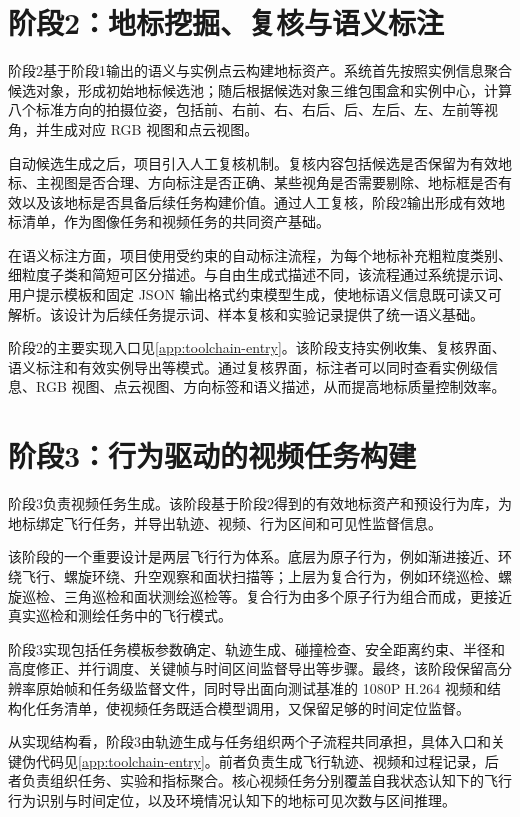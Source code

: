 \section{阶段2：地标挖掘、复核与语义标注}

阶段2基于阶段1输出的语义与实例点云构建地标资产。系统首先按照实例信息聚合候选对象，形成初始地标候选池；随后根据候选对象三维包围盒和实例中心，计算八个标准方向的拍摄位姿，包括前、右前、右、右后、后、左后、左、左前等视角，并生成对应 RGB 视图和点云视图。

自动候选生成之后，项目引入人工复核机制。复核内容包括候选是否保留为有效地标、主视图是否合理、方向标注是否正确、某些视角是否需要剔除、地标框是否有效以及该地标是否具备后续任务构建价值。通过人工复核，阶段2输出形成有效地标清单，作为图像任务和视频任务的共同资产基础。

在语义标注方面，项目使用受约束的自动标注流程，为每个地标补充粗粒度类别、细粒度子类和简短可区分描述。与自由生成式描述不同，该流程通过系统提示词、用户提示模板和固定 JSON 输出格式约束模型生成，使地标语义信息既可读又可解析。该设计为后续任务提示词、样本复核和实验记录提供了统一语义基础。

阶段2的主要实现入口见\autoref{app:toolchain-entry}。该阶段支持实例收集、复核界面、语义标注和有效实例导出等模式。通过复核界面，标注者可以同时查看实例级信息、RGB 视图、点云视图、方向标签和语义描述，从而提高地标质量控制效率。

\section{阶段3：行为驱动的视频任务构建}

阶段3负责视频任务生成。该阶段基于阶段2得到的有效地标资产和预设行为库，为地标绑定飞行任务，并导出轨迹、视频、行为区间和可见性监督信息。

该阶段的一个重要设计是两层飞行行为体系。底层为原子行为，例如渐进接近、环绕飞行、螺旋环绕、升空观察和面状扫描等；上层为复合行为，例如环绕巡检、螺旋巡检、三角巡检和面状测绘巡检等。复合行为由多个原子行为组合而成，更接近真实巡检和测绘任务中的飞行模式。

阶段3实现包括任务模板参数确定、轨迹生成、碰撞检查、安全距离约束、半径和高度修正、并行调度、关键帧与时间区间监督导出等步骤。最终，该阶段保留高分辨率原始帧和任务级监督文件，同时导出面向测试基准的 1080P H.264 视频和结构化任务清单，使视频任务既适合模型调用，又保留足够的时间定位监督。

从实现结构看，阶段3由轨迹生成与任务组织两个子流程共同承担，具体入口和关键伪代码见\autoref{app:toolchain-entry}。前者负责生成飞行轨迹、视频和过程记录，后者负责组织任务、实验和指标聚合。核心视频任务分别覆盖自我状态认知下的飞行行为识别与时间定位，以及环境情况认知下的地标可见次数与区间推理。

